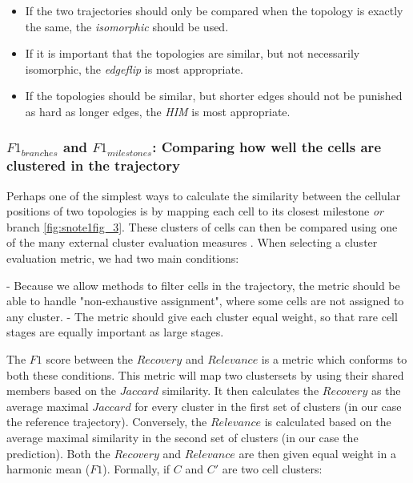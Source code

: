 \begin{itemize}
	\item If the two trajectories should only be compared when the topology is exactly the same, the \textit{isomorphic} should be used.
	\item If it is important that the topologies are similar, but not necessarily isomorphic, the \textit{edgeflip} is most appropriate.
	\item If the topologies should be similar, but shorter edges should not be punished as hard as longer edges, the \textit{HIM} is most appropriate.
\end{itemize}

\subsubsection{$\textit{F1}_{\textit{branches}}$ and $\textit{F1}_{\textit{milestones}}$: Comparing how well the cells are clustered in the trajectory}

Perhaps one of the simplest ways to calculate the similarity between the cellular positions of two topologies is by mapping each cell to its closest milestone \textit{or} branch \ref{fig:snote1fig_3}. These clusters of cells can then be compared using one of the many external cluster evaluation measures \cite{saelens_comprehensiveevaluationmodule_2018}. When selecting a cluster evaluation metric, we had two main conditions:

- Because we allow methods to filter cells in the trajectory, the metric should be able to handle "non-exhaustive assignment", where some cells are not assigned to any cluster.
- The metric should give each cluster equal weight, so that rare cell stages are equally important as large stages.

The $\textit{F1}$ score between the $\textit{Recovery}$ and $\textit{Relevance}$ is a metric which conforms to both these conditions. This metric will map two clustersets by using their shared members based on the $\textit{Jaccard}$ similarity. It then calculates the $\textit{Recovery}$ as the average maximal $\textit{Jaccard}$ for every cluster in the first set of clusters (in our case the reference trajectory). Conversely, the $\textit{Relevance}$ is calculated based on the average maximal similarity in the second set of clusters (in our case the prediction). Both the $\textit{Recovery}$ and $\textit{Relevance}$ are then given equal weight in a harmonic mean ($\textit{F1}$). Formally, if $C$ and $C'$ are two cell clusters:


